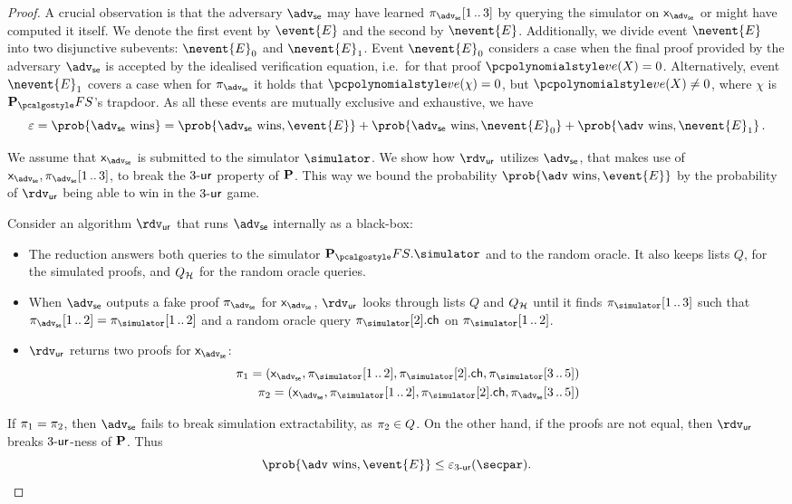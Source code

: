 \documentclass[runningheads,11pt]{llncs}
\theoremstyle{definition}
\begin{document}
\begin{proof}
A crucial observation is that the adversary $\advse$ may have learned $\zkproof_{\advse}\range{1}{3}$ by querying the simulator on $\inp_{\advse}$ or might have computed it itself. We denote the first event by $\event{E}$ and the second by $\nevent{E}$. 
%
Additionally, we divide event $\nevent{E}$ into two disjunctive subevents: $\nevent{E}_0$ and $\nevent{E}_1$. 
Event $\nevent{E}_0$ considers a case when the final proof provided by the adversary $\advse$ is accepted by the idealised verification equation, i.e.~for that proof $\vereq(X) = 0$. 
Alternatively, event $\nevent{E}_1$ covers a case when for $\zkproof_\advse$ it
holds that $\vereq(\chi) = 0$, but $\vereq(X) \neq 0$, where $\chi$ is $\plonkprotfs$'s trapdoor.
%
As all these events are mutually exclusive and exhaustive, we have
\[
	\eps = \prob{\advse \text{ wins}} = \prob{\advse \text{ wins}, \event{E}} + \prob{\advse \text{ wins}, \nevent{E}_0} + \prob{\adv \text{ wins}, \nevent{E}_1}\,.
\]

We assume that $\inp_{\advse}$ is submitted to the simulator $\simulator$. 
We show how $\rdvur$ utilizes $\advse$, that makes use of $\inp_\advse, \zkproof_{\advse}\range{1}{3}$, to break the ${3\text{-}\mathsf{ur}}$ property of $\mathbf{P}$. 
This way we bound the probability $\prob{\adv \text{ wins}, \event{E}}$ by the probability of $\rdvur$ being able to win in the ${3\text{-}\mathsf{ur}}$ game.

Consider an algorithm $\rdvur$ that runs $\advse$ internally as a black-box:
\begin{itemize}
	\item The reduction answers both queries to the simulator $\plonkprotfs.\simulator$ and to the random oracle. 
	It also keeps lists $Q$, for the simulated proofs, and $Q_{\mathcal{H}}$ for the random oracle queries. 
	\item When $\advse$ outputs a fake proof $\zkproof_{\advse}$ for  $\inp_\advse$, $\rdvur$ looks through lists $Q$ and $Q_{\mathcal{H}}$ until it finds 
	$\zkproof_{\simulator}\range{1}{3}$ such that $\zkproof_{\advse}\range{1}{2} = \zkproof_{\simulator}\range{1}{2}$ and a random oracle query $\zkproof_{\simulator}[2].\ch$ on $\zkproof_{\simulator}\range{1}{2}$.
	\item $\rdvur$ returns two proofs for $\inp_\advse$:
	\begin{align*}
		\zkproof_1 = (\inp_{\advse},\zkproof_{\simulator}\range{1}{2}, \zkproof_{\simulator}[2].\ch, \zkproof_{\simulator}\range{3}{5})\\
		\zkproof_2 = (\inp_{\advse}, \zkproof_{\simulator}\range{1}{2}, \zkproof_{\simulator}[2].\ch, \zkproof_{\advse}\range{3}{5})
	\end{align*}
	\end{itemize}  
	If $\pi_1 = \pi_2$, then $\advse$ fails to break simulation extractability, as $\pi_2 \in Q$.
	On the other hand, if the proofs are not equal, then $\rdvur$ breaks ${3\text{-}\mathsf{ur}}$-ness of $\mathbf{P}$. Thus 
	\[
		\prob{\adv \text{ wins}, \event{E}} \leq \eps_{\ur{3}}(\secpar).
	\]
	

\end{proof}
\end{document}
